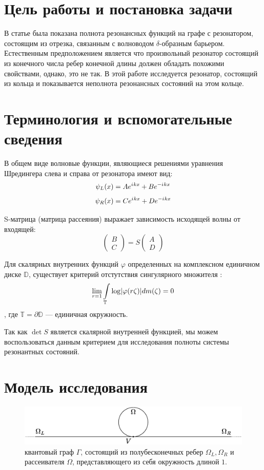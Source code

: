 \documentclass{nsart_eng}
\DeclarePairedDelimiter{\abs}{\lvert}{\rvert}
\newcommand{\bbT}{\mathbb{T}}
\newcommand{\bbD}{\mathbb{D}}
\newcommand{\eexp}[1]{e^{#1}}
\newcommand{\iu}{{i\mkern1mu}}
\renewcommand{\phi}{\varphi}
\begin{document}
\section{Цель работы и постановка задачи}
В статье \cite{popov_exner70} была показана полнота резонансных функций на графе с резонатором, состоящим из отрезка, связанным с волноводом $\delta$-образным барьером. Естественным предположением является что произвольный резонатор состоящий из конечного числа ребер конечной длины должен обладать похожими свойствами, однако, это не так. В этой работе исследуется резонатор, состоящий из кольца и показывается неполнота резонансных состояний на этом кольце.

\section{Терминология и вспомогательные сведения}
В общем виде волновые функции, являющиеся решениями уравнения Шредингера слева и справа от резонатора имеют вид:
\[
\psi_L(x) = A \eexp{\iu k x} + B \eexp{-\iu k x}
\]
\[
\psi_R(x) = C \eexp{\iu k x} + D \eexp{-\iu k x}
\]

S-матрица (матрица рассеяния) выражает зависимость исходящей волны от входящей:
\[
\begin{pmatrix} B \\ C \end{pmatrix} = S \begin{pmatrix} A \\ D \end{pmatrix}
\]

Для скалярных внутренних функций $\phi$ определенных на комплексном единичном диске $\bbD$, существует критерий отстутствия сингулярного множителя \cite[стр. 99]{nikolskii}:
\[
\lim\limits_{r = 1} \int\limits_{\bbT} \log \abs{\phi(r \zeta)} d m(\zeta) = 0
\]
, где $\bbT = \partial \bbD$ — единичная окружность.

Так как $\det S$ является скалярной внутренней функцией, мы можем воспользоваться данным критерием для исследования полноты системы резонантных состояний.

\section{Модель исследования}
\begin{figure}[!htb]
\includegraphics[width=\textwidth,keepaspectratio]{graph.eps}
\caption{квантовый граф $\Gamma$, состоящий из полубесконечных ребер $\Omega_L, \Omega_R$ и рассеивателя $\Omega$, представляющего из себя окружность длиной $1$.}
\end{figure}
\end{document}
